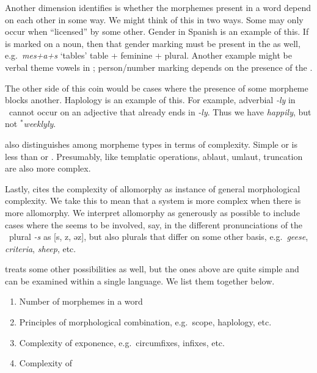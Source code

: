 \documentclass[output=paper,
modfonts
]{LSP/langsci}
\begin{document}
Another dimension \citeauthor{dimensions} identifies is whether the morphemes present in a word depend on each other in some way. We might think of this in two ways. Some  may only occur when ``licensed'' by some other. Gender in Spanish is an example of this. If  is marked on a noun, then that gender marking must be present in the  as well, e.g.\ \emph{mes+a+s} `tables' table + feminine + plural. Another example might be verbal theme vowels in ; person/number marking depends on the presence of the .

The other side of this coin would be cases where the presence of some morpheme blocks another. Haplology is an example of this. For example, adverbial \emph{-ly} in \e\ cannot occur on an adjective that already ends in \emph{-ly}. Thus we have \emph{happily}, but not ${}^*$\emph{weeklyly}.

\citeauthor{dimensions} also distinguishes among morpheme types in terms of complexity. Simple  or  is less  than  or . Presumably,  like templatic operations, ablaut, umlaut, truncation are also more complex.

Lastly, \citeauthor{dimensions} cites the complexity of allomorphy as   instance of general morphological complexity. We take this to mean that a system is more complex when there is more allomorphy. We interpret allomorphy as generously as possible to include cases where the  seems to be involved, say, in the different pronunciations of the \e\ plural \emph{-s} as [s, z, əz], but also plurals that differ on some other basis, e.g.\ \emph{geese}, \emph{criteria}, \emph{sheep}, etc.

\citeauthor{dimensions} treats some other possibilities as well, but the ones above are quite simple and can be examined within a single language. We list them together below.

\begin{enumerate}
\item Number of morphemes in a word %
\item Principles of morphological combination, e.g.\ scope, haplology, etc. %
\item Complexity of exponence, e.g.\ circumfixes, infixes, etc. %
\item Complexity of  %
\end{enumerate}
\end{document}
